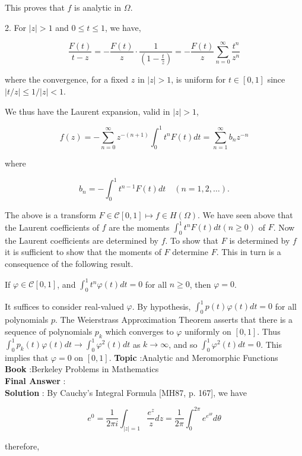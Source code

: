 \documentclass[10pt]{article}
\begin{document}
This proves that $f$ is analytic in $\Omega$.

2. For $|z|>1$ and $0 \leqslant t \leqslant 1$, we have,

$$
\frac{F(t)}{t-z}=-\frac{F(t)}{z} \cdot \frac{1}{\left(1-\frac{t}{z}\right)}=-\frac{F(t)}{z} \sum_{n=0}^{\infty} \frac{t^{n}}{z^{n}}
$$

where the convergence, for a fixed $z$ in $|z|>1$, is uniform for $t \in[0,1]$ since $|t / z| \leqslant 1 /|z|<1$.

We thus have the Laurent expansion, valid in $|z|>1$,

$$
f(z)=-\sum_{n=0}^{\infty} z^{-(n+1)} \int_{0}^{1} t^{n} F(t) d t=\sum_{n=1}^{\infty} b_{n} z^{-n}
$$

where

$$
b_{n}=-\int_{0}^{1} t^{n-1} F(t) d t \quad(n=1,2, \ldots) .
$$

The above is a transform $F \in \mathcal{C}[0,1] \mapsto f \in H(\Omega)$. We have seen above that the Laurent coefficients of $f$ are the moments $\int_{0}^{1} t^{n} F(t) d t(n \geqslant 0)$ of $F$. Now the Laurent coefficients are determined by $f$. To show that $F$ is determined by $f$ it is sufficient to show that the moments of $F$ determine $F$. This in turn is a consequence of the following result.

If $\varphi \in \mathcal{C}[0,1]$, and $\int_{0}^{1} t^{n} \varphi(t) d t=0$ for all $n \geqslant 0$, then $\varphi=0$.

It suffices to consider real-valued $\varphi$. By hypothesis, $\int_{0}^{1} p(t) \varphi(t) d t=0$ for all polynomials $p$. The Weierstrass Approximation Theorem asserts that there is a sequence of polynomials $p_{k}$ which converges to $\varphi$ uniformly on $[0,1]$. Thus $\int_{0}^{1} p_{k}(t) \varphi(t) d t \rightarrow \int_{0}^{1} \varphi^{2}(t) d t$ as $k \rightarrow \infty$, and so $\int_{0}^{1} \varphi^{2}(t) d t=0$. This implies that $\varphi=0$ on $[0,1]$.
\textbf{Topic} :Analytic and Meromorphic Functions \\
\textbf{Book} :Berkeley Problems in Mathematics\\
\textbf{Final Answer} :\\


\textbf{Solution} : By Cauchy's Integral Formula [MH87, p. 167], we have

$$
e^{0}=\frac{1}{2 \pi i} \int_{|z|=1} \frac{e^{z}}{z} d z=\frac{1}{2 \pi} \int_{0}^{2 \pi} e^{e^{i \theta}} d \theta
$$

therefore,
\end{document}
